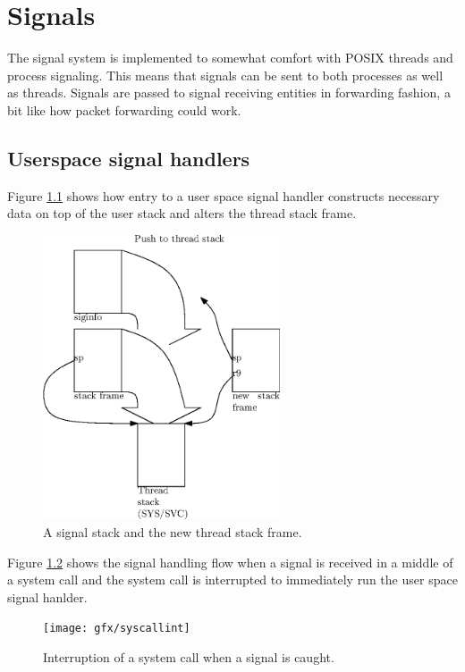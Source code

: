 \chapter{Signals}

The signal system is implemented to somewhat comfort with \acs{POSIX} threads
and process signaling. This means that signals can be sent to both processes as
well as threads. Signals are passed to signal receiving entities in forwarding
fashion, a bit like how packet forwarding could work.

\section{Userspace signal handlers}

Figure \ref{figure:sigstack} shows how entry to a user space signal handler
constructs necessary data on top of the user stack and alters the thread
stack frame.

\begin{figure}
  \center
  \includegraphics[width=7cm]{pics/signal_stack}
  \caption{A signal stack and the new thread stack frame.}
  \label{figure:sigstack}
\end{figure}

Figure \ref{figure:syscallint} shows the signal handling flow when
a signal is received in a middle of a system call and the system call
is interrupted to immediately run the user space signal hanlder.

\begin{figure}
    \center
    \texttt{[image: gfx/syscallint]}
    \caption{Interruption of a system call when a signal is caught.}
    \label{figure:syscallint}
\end{figure}
